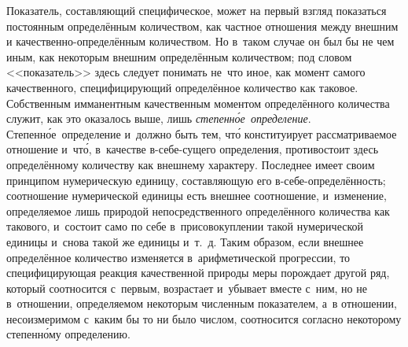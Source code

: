 Показатель, составляющий специфическое, может на первый взгляд показаться
постоянным определённым количеством, как частное отношения между внешним и
качественно-определённым количеством. Но в~таком случае он был бы не чем иным,
как некоторым внешним определённым количеством; под словом <<показатель>> здесь
следует понимать не~что иное, как момент самого качественного, специфицирующий
определённое количество как таковое. Собственным имманентным качественным
моментом определённого количества служит, как это оказалось выше, лишь
{\em степенн\'{о}е~определение}. Степенн\'{о}е~определение и~должно быть тем,
чт\'{о} конституирует рассматриваемое отношение и~чт\'{о}, в~качестве
в-себе-сущего определения, противостоит здесь определённому количеству как
внешнему характеру. Последнее имеет своим принципом нумерическую единицу,
составляющую его в-себе-определённость; соотношение нумерической единицы есть
внешнее соотношение, и~изменение, определяемое лишь природой непосредственного
определённого количества как такового, и~состоит само по себе в~присовокуплении
такой нумерической единицы и~снова такой же единицы и~т.~д. Таким образом, если
внешнее определённое количество изменяется в~арифметической прогрессии, то
специфицирующая реакция качественной природы меры порождает другой ряд, который
соотносится с~первым, возрастает и~убывает вместе с~ним, но не в~отношении,
определяемом некоторым численным показателем, а~в отношении, несоизмеримом
с~каким бы то ни было числом, соотносится согласно некоторому степенн\'{о}му
определению.

\subsubsection[Примечание]{}

